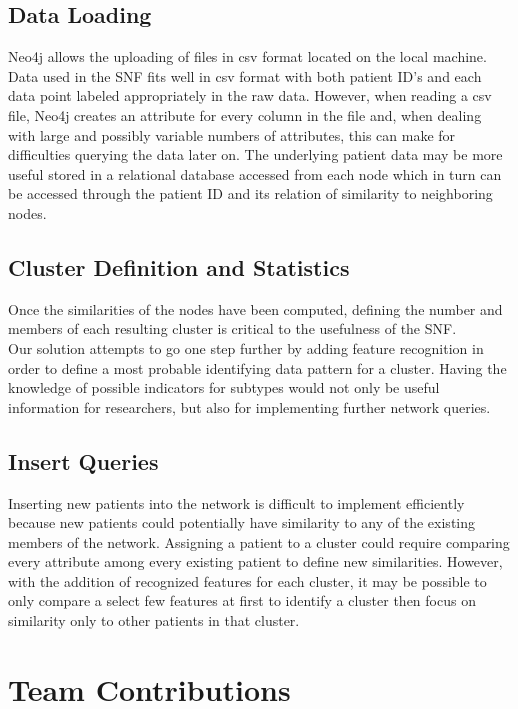 \documentclass[12pt]{article}
\begin{document}
\subsection*{Data Loading}
\quad Neo4j allows the uploading of files in csv format located on the local machine. Data used in the SNF fits well in csv format with both patient ID's and each data point labeled appropriately in the raw data. However, when reading a csv file, Neo4j creates an attribute for every column in the file and, when dealing with large and possibly variable numbers of attributes, this can make for difficulties querying the data later on. The underlying patient data may be more useful stored in a relational database accessed from each node which in turn can be accessed through the patient ID and its relation of similarity to neighboring nodes.
\subsection*{Cluster Definition and Statistics}
\quad Once the similarities of the nodes have been computed, defining the number and members of each resulting cluster is critical to the usefulness of the SNF. \\
\quad Our solution attempts to go one step further by adding feature recognition in order to define a most probable identifying data pattern for a cluster. Having the knowledge of possible indicators for subtypes would not only be useful information for researchers, but also for implementing further network queries.
\subsection*{Insert Queries}
\quad Inserting new patients into the network is difficult to implement efficiently because new patients could potentially have similarity to any of the existing members of the network. Assigning a patient to a cluster could require comparing every attribute among every existing patient to define new similarities. However, with the addition of recognized features for each cluster, it may be possible to only compare a select few features at first to identify a cluster then focus on similarity only to other patients in that cluster. 
\section*{Team Contributions}


\end{document}
